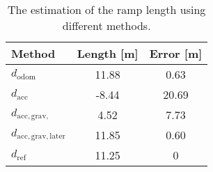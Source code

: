 \begin{table}[htb]
    \centering
    \caption[Ramp length estimation]{The estimation of the ramp length using different methods.}
    \label{tab:ramp_length}
    \begin{tabular}{lSS}
        \toprule
        \textbf{Method}                & {\textbf{Length} [\si{\metre}]} & {\textbf{Error} [\si{\metre}]} \\
        \midrule
        $d_\mathrm{odom} $             & 11.88                           & 0.63                           \\
        $d_\mathrm{acc} $              & -8.44                           & 20.69                          \\
        $d_\mathrm{acc, grav, } $      & 4.52                            & 7.73                           \\
        $d_\mathrm{acc, grav, later} $ & 11.85                           & 0.60                           \\
        $d_\mathrm{ref} $              & 11.25                           & 0                              \\
        \bottomrule
    \end{tabular}
\end{table}



